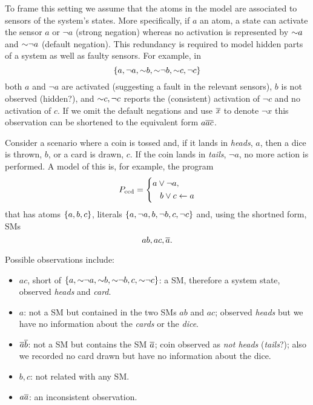 \documentclass[x11names]{article}
\begin{document}
To frame this setting  we assume that the atoms in the model are associated to sensors of the system's states. 
More specifically, if $a$ an atom, a state can activate the sensor $a$ or $\neg a$ (strong negation) whereas no activation is represented by $\operatorname{\sim\!} a$ and $\operatorname{\sim\!} \neg a$ (default negation).
This redundancy is required to model hidden parts of a system as well as faulty sensors.
For example, in
$$\left\{ a, \neg a, \operatorname{\sim\!} b, \operatorname{\sim\!} \neg b, \operatorname{\sim\!} c, \neg c \right\}$$
both $a$ and $\neg a$ are activated (suggesting a fault in the relevant sensors), $b$ is not observed (hidden?), and $\operatorname{\sim\!} c, \neg c$ reports the (consistent) activation of $\neg c$ and no activation of $c$.
If we omit the default negations and use $\overline{x}$ to denote $\neg x$ this observation can be shortened to the equivalent form $a\overline{a}\overline{c}$. 

\begin{example}
    Consider a scenario where a coin is tossed and, if it lands in \emph{heads}, $a$, then a dice is thrown, $b$, or a card is drawn, $c$. If the coin lands in \emph{tails}, $\neg a$, no more action is performed. A model of this is, for example, the program  
    \begin{equation}\label{eq:derived.fruitful}
        P_{\mathrm{ccd}} = \left\lbrace\begin{aligned}
            a \vee \neg{a}  & ,          %
            \\
            b \vee c        & \clause a
        \end{aligned}
        \right.
    \end{equation}
    that has atoms $\set{a, b, c}$, literals $\set{a, \neg a, b, \neg b, c, \neg c}$ and, using the shortned form, \aclp{SM}
    \begin{equation}
        ab, ac, \overline{a}.
    \end{equation}
    
    
    Possible observations include:
    \begin{itemize}\tight
        \item $ac$, short of $\{a,\operatorname{\sim\!}\neg a,\operatorname{\sim\!} b, \operatorname{\sim\!} \neg b, c, \operatorname{\sim\!} \neg c\}$: a \acl{SM}, therefore a system state, observed \emph{heads} and \emph{card}.
        \item $a$: not a \acs{SM} but contained in the two \acsp{SM} $ab$ and $ac$; observed \emph{heads} but we have no information about the \emph{cards} or the \emph{dice}.
        \item $\overline{a}\overline{b}$: not a \acs{SM} but contains the \acs{SM} $\overline{a}$; coin observed as \emph{not heads} (\emph{tails}?); also we recorded no card drawn but have no information about the dice.
        \item $b,c$: not related with any \acs{SM}.
        \item $a\overline{a}$: an inconsistent observation.
    \end{itemize}    
\end{example}
\end{document}
